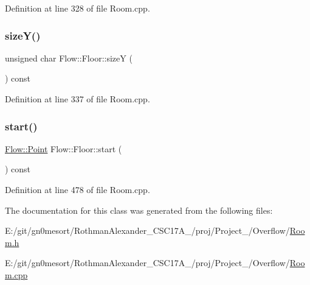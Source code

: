 Definition at line 328 of file Room.\+cpp.

\hypertarget{class_flow_1_1_floor_a6b25e8faedfd7de16efea8523c45794c}{}\label{class_flow_1_1_floor_a6b25e8faedfd7de16efea8523c45794c} 
\subsubsection{\texorpdfstring{size\+Y()}{sizeY()}}
{\footnotesize\ttfamily unsigned char Flow\+::\+Floor\+::sizeY (\begin{DoxyParamCaption}{ }\end{DoxyParamCaption}) const}



Definition at line 337 of file Room.\+cpp.

\hypertarget{class_flow_1_1_floor_aaac7f88dd55b4fe38ba36f686109fe7b}{}\label{class_flow_1_1_floor_aaac7f88dd55b4fe38ba36f686109fe7b} 
\subsubsection{\texorpdfstring{start()}{start()}}
{\footnotesize\ttfamily \hyperlink{struct_flow_1_1_point}{Flow\+::\+Point} Flow\+::\+Floor\+::start (\begin{DoxyParamCaption}{ }\end{DoxyParamCaption}) const}



Definition at line 478 of file Room.\+cpp.



The documentation for this class was generated from the following files\+:\begin{DoxyCompactItemize}
\item 
E\+:/git/gn0mesort/\+Rothman\+Alexander\+\_\+\+C\+S\+C17\+A\+\_/proj/\+Project\+\_/\+Overflow/\hyperlink{_room_8h}{Room.\+h}\item 
E\+:/git/gn0mesort/\+Rothman\+Alexander\+\_\+\+C\+S\+C17\+A\+\_/proj/\+Project\+\_/\+Overflow/\hyperlink{_room_8cpp}{Room.\+cpp}\end{DoxyCompactItemize}
